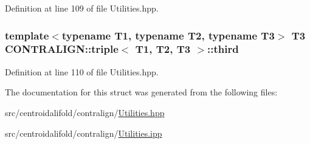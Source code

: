 Definition at line 109 of file Utilities.\+hpp.

\hypertarget{struct_c_o_n_t_r_a_l_i_g_n_1_1triple_a1ca35d32af351799a3b1132ad6f9ecfd}{
\subsubsection[{third}]{\setlength{\rightskip}{0pt plus 5cm}template$<$typename T1, typename T2, typename T3$>$ T3 {\bf C\+O\+N\+T\+R\+A\+L\+I\+G\+N\+::triple}$<$ T1, T2, T3 $>$\+::third}}\label{struct_c_o_n_t_r_a_l_i_g_n_1_1triple_a1ca35d32af351799a3b1132ad6f9ecfd}


Definition at line 110 of file Utilities.\+hpp.



The documentation for this struct was generated from the following files\+:\begin{DoxyCompactItemize}
\item 
src/centroidalifold/contralign/\hyperlink{centroidalifold_2contralign_2_utilities_8hpp}{Utilities.\+hpp}\item 
src/centroidalifold/contralign/\hyperlink{centroidalifold_2contralign_2_utilities_8ipp}{Utilities.\+ipp}\end{DoxyCompactItemize}
